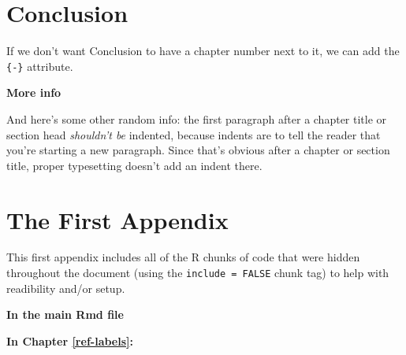 \documentclass[12pt,twoside]{reedthesis}
\theoremstyle{definition}
\theoremstyle{definition}
\theoremstyle{definition}
\theoremstyle{remark}
\begin{document}
\chapter*{Conclusion}\label{conclusion}

If we don't want Conclusion to have a chapter number next to it, we can
add the \texttt{\{-\}} attribute.

\textbf{More info}

And here's some other random info: the first paragraph after a chapter
title or section head \emph{shouldn't be} indented, because indents are
to tell the reader that you're starting a new paragraph. Since that's
obvious after a chapter or section title, proper typesetting doesn't add
an indent there.

\appendix

\chapter{The First Appendix}\label{the-first-appendix}

This first appendix includes all of the R chunks of code that were
hidden throughout the document (using the \texttt{include\ =\ FALSE}
chunk tag) to help with readibility and/or setup.

\textbf{In the main Rmd file}
\begin{Shaded}
\begin{Highlighting}[]
\NormalTok{(}\OperatorTok{!}
  \NormalTok{(}\NormalTok{, } \NormalTok{)}
\NormalTok{(}\OperatorTok{!}
\OperatorTok{::}\NormalTok{(}\NormalTok{)}
\end{Highlighting}
\end{Shaded}
\textbf{In Chapter \ref{ref-labels}:}
\end{document}
